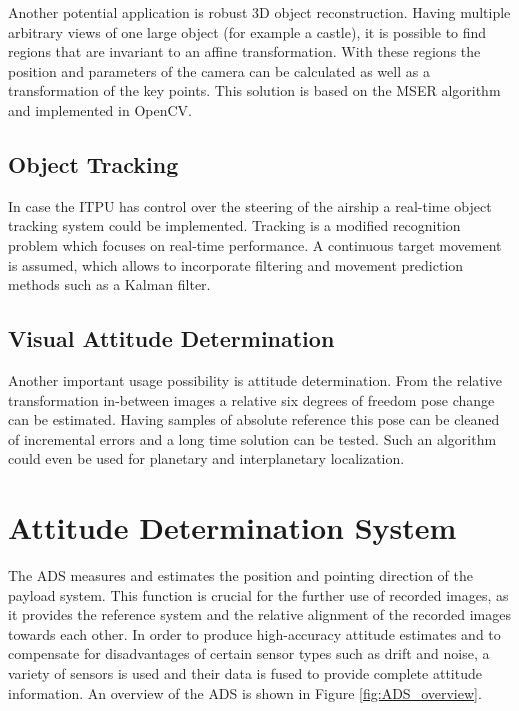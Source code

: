 Another potential application is robust 3D object reconstruction. Having multiple arbitrary views of one large object (for example a castle), it is possible to find regions that are invariant to an affine transformation. With these regions the position and parameters of the camera can be calculated as well as a transformation of the key points. This solution is based on the MSER algorithm and implemented in OpenCV.

\subsection{Object Tracking}

In case the \ac{ITPU} has control over the steering of the airship a real-time object tracking system could be implemented. Tracking is a modified recognition problem which focuses on real-time performance. A continuous target movement is assumed, which allows to incorporate filtering and movement prediction methods such as a Kalman filter. 

\subsection{Visual Attitude Determination}

Another important usage possibility is attitude determination. From the relative transformation in-between images a relative six degrees of freedom pose change can be estimated. Having samples of absolute reference this pose can be cleaned of incremental errors and a long time solution can be tested. Such an algorithm could even be used for planetary and interplanetary localization.

\FloatBarrier
\section{Attitude Determination System}

The \ac{ADS} measures and estimates the position and pointing direction of the payload system. This function is crucial for the further use of recorded images, as it provides the reference system and the relative alignment of the recorded images towards each other. In order to produce high-accuracy attitude estimates and to compensate for disadvantages of certain sensor types such as drift and noise, a variety of sensors is used and their data is fused to provide complete attitude information. An overview of the \ac{ADS} is shown in Figure \ref{fig:ADS_overview}.
\vspace{1.0em}

